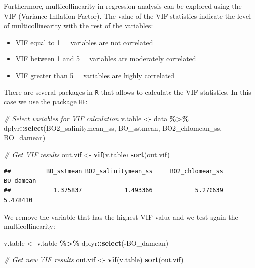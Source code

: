 \documentclass[
]{book}
\newenvironment{Shaded}{\begin{snugshade}}{\end{snugshade}}
\newcommand{\CommentTok}[1]{\textcolor[rgb]{0.56,0.35,0.01}{\textit{#1}}}
\newcommand{\FunctionTok}[1]{\textcolor[rgb]{0.13,0.29,0.53}{\textbf{#1}}}
\newcommand{\NormalTok}[1]{#1}
\newcommand{\OtherTok}[1]{\textcolor[rgb]{0.56,0.35,0.01}{#1}}
\newcommand{\SpecialCharTok}[1]{\textcolor[rgb]{0.81,0.36,0.00}{\textbf{#1}}}
\providecommand{\tightlist}{%
  \setlength{\itemsep}{0pt}\setlength{\parskip}{0pt}}
\begin{document}
Furthermore, multicollinearity in regression analysis can be explored using the VIF (Variance Inflation Factor). The value of the VIF statistics indicate the level of multicollinearity with the rest of the variables:

\begin{itemize}
\tightlist
\item
  VIF equal to 1 = variables are not correlated
\item
  VIF between 1 and 5 = variables are moderately correlated
\item
  VIF greater than 5 = variables are highly correlated
\end{itemize}

There are several packages in \texttt{R} that allows to calculate the VIF statistics. In this case we use the package \texttt{HH}:

\begin{Shaded}
\begin{Highlighting}[]
\CommentTok{\# Select variables for VIF calculation}
\NormalTok{v.table }\OtherTok{\textless{}{-}}\NormalTok{ data }\SpecialCharTok{\%\textgreater{}\%}
\NormalTok{    dplyr}\SpecialCharTok{::}\FunctionTok{select}\NormalTok{(BO2\_salinitymean\_ss, BO\_sstmean,}
\NormalTok{        BO2\_chlomean\_ss, BO\_damean)}

\CommentTok{\# Get VIF results}
\NormalTok{out.vif }\OtherTok{\textless{}{-}} \FunctionTok{vif}\NormalTok{(v.table)}
\FunctionTok{sort}\NormalTok{(out.vif)}
\end{Highlighting}
\end{Shaded}

\begin{verbatim}
##          BO_sstmean BO2_salinitymean_ss     BO2_chlomean_ss           BO_damean 
##            1.375837            1.493366            5.270639            5.478410
\end{verbatim}

We remove the variable that has the highest VIF value and we test again the multicollinearity:

\begin{Shaded}
\begin{Highlighting}[]
\NormalTok{v.table }\OtherTok{\textless{}{-}}\NormalTok{ v.table }\SpecialCharTok{\%\textgreater{}\%}
\NormalTok{    dplyr}\SpecialCharTok{::}\FunctionTok{select}\NormalTok{(}\SpecialCharTok{{-}}\NormalTok{BO\_damean)}

\CommentTok{\# Get new VIF results}
\NormalTok{out.vif }\OtherTok{\textless{}{-}} \FunctionTok{vif}\NormalTok{(v.table)}
\FunctionTok{sort}\NormalTok{(out.vif)}
\end{Highlighting}
\end{Shaded}
\end{document}
